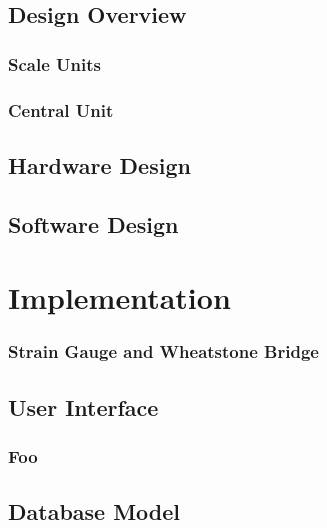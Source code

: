 \documentclass{l3proj}
\begin{document}
\section{Design Overview}

\subsection{Scale Units}
\label{scale}

\subsection{Central Unit}
\label{central}


\label{Block Diagram}
\section{Hardware Design}


\section{Software Design}

\chapter{Implementation}
\label{impl}
\subsection{Strain Gauge and Wheatstone Bridge}


\section{User Interface}

\subsection{Foo}

\section{Database Model}
\end{document}
